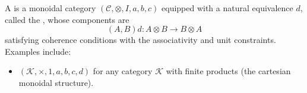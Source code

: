A  is a monoidal category $(\mathcal{C}, \otimes, I, a, b, c)$ equipped with a natural equivalence $d$, called the , whose components are
$$
(A, B)d: A \otimes B \longrightarrow B \otimes A
$$
satisfying coherence conditions with the associativity and unit constraints. Examples include:
\begin{itemize}
\item $(\mathcal{K}, \times, 1, a, b, c, d)$ for any category $\mathcal{K}$ with finite products (the cartesian monoidal structure).
\end{itemize}
